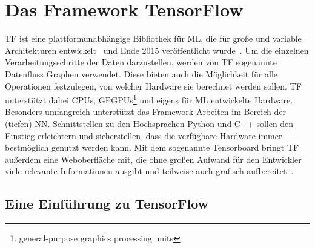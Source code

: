 \chapter{Das Framework TensorFlow}

\gls{TF} ist eine plattformunabhängige Bibliothek für \gls{ML}, die für große und variable Architekturen entwickelt~\cite{tensorflow2015-whitepaper} und Ende 2015 veröffentlicht wurde~\cite{tf-opensource}. Um die einzelnen Verarbeitungsschritte der Daten darzustellen, werden von \gls{TF} sogenannte Datenfluss Graphen verwendet. Diese bieten auch die Möglichkeit für alle Operationen festzulegen, von welcher Hardware sie berechnet werden sollen. \gls{TF} unterstützt dabei CPUs, GPGPUs\footnote{general-purpose graphics processing units} und eigens für \gls{ML} entwickelte Hardware.
Besonders umfangreich unterstützt das Framework Arbeiten im Bereich der (tiefen) \gls{NN}. Schnittstellen zu den Hochsprachen Python und C++ sollen den Einstieg erleichtern und sicherstellen, dass die verfügbare Hardware immer bestmöglich genutzt werden kann. Mit dem sogenannte Tensorboard bringt \gls{TF} außerdem eine Weboberfläche mit, die ohne großen Aufwand für den Entwickler viele relevante Informationen ausgibt und teilweise auch grafisch aufbereitet~\cite{tensorflow2016-whitepaper}.

\section{Eine Einführung zu TensorFlow}


